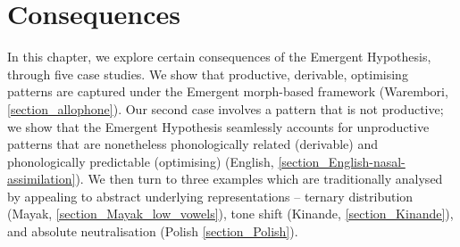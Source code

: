 
\chapter{Consequences}\label{chapter_consequences} \label{ch5}
In this chapter, we explore  certain consequences of the Emergent Hypothesis, through five case studies. We show that  productive, derivable, optimising patterns are captured under the Emergent morph-based framework (Warembori, \Sec\ref{section_allophone}). Our second case involves a pattern that is not productive; we show that the Emergent Hypothesis seamlessly accounts for unproductive patterns that are nonetheless phonologically related (derivable) and phonologically predictable (optimising) (English, \textsection\ref{section_English-nasal-assimilation}). We then turn to three examples which are traditionally analysed by appealing to abstract underlying representations --  ternary distribution  (Mayak, \textsection\ref{section_Mayak_low_vowels}), tone shift (Kinande, \textsection\ref{section_Kinande}), and absolute neutralisation (Polish \textsection\ref{section_Polish}).

